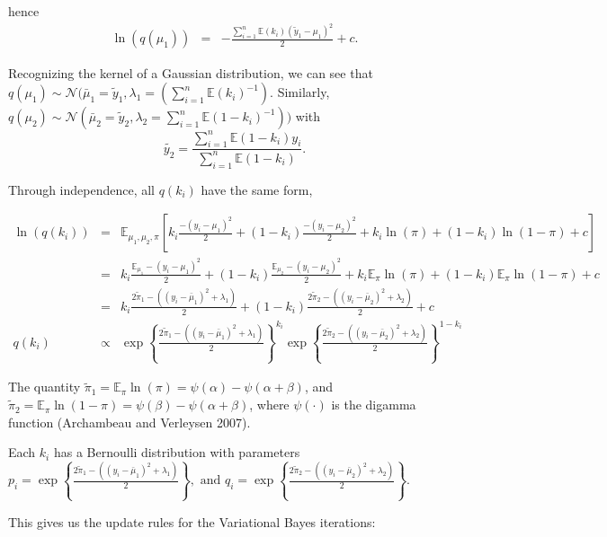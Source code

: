 \documentclass[12pt]{article}
\begin{document}
hence 
\begin{eqnarray*}
\ln(q(\mu_1)) & = & -\frac{\sum_{i=1}^{n}\mathbb{E}(k_i) (\tilde{y}_1-\mu_{1})^2}{2} + c.
\end{eqnarray*}


Recognizing the kernel of a Gaussian distribution, we can see that $q(\mu_1) \sim \mathcal{N} (\bar{\mu}_{1} = \tilde{y}_1, \lambda_{1} = (\sum_{i=1}^{n}\mathbb{E}(k_i)^{-1}).$
Similarly, $q(\mu_2) \sim \mathcal{N} (\bar{\mu}_{2} = \tilde{y}_2, \lambda_{2} = \sum_{i=1}^{n}\mathbb{E}(1-k_i)^{-1}))$ with
$$\tilde{y_2} = \frac{\sum_{i=1}^{n} \mathbb{E}(1-k_i)y_i}{\sum_{i=1}^{n} \mathbb{E}(1-k_i)}.$$

Through independence, all $q(k_i)$ have the same form,

\begin{eqnarray*}
\ln(q(k_i)) & = & \mathbb{E}_{\mu_1, \mu_2, \pi} \left[ k_{i} \frac{-(y_i-\mu_1)^2}{2} + (1-k_{i}) \frac{-(y_i-\mu_2)^2}{2} + k_i \ln(\pi) + (1-k_i) \ln(1-\pi) + c \right]\\
& = & k_i\frac{\mathbb{E}_{\mu_1} -(y_i-\mu_1)^2}{2}  + (1-k_i) \frac{\mathbb{E}_{\mu_2} -(y_i-\mu_2)^2}{2}  + k_i \mathbb{E}_\pi \ln(\pi) + (1-k_i) \mathbb{E}_\pi \ln(1-\pi) + c \\
& = & k_i \frac{2\tilde{\pi}_1-((y_i - \bar{\mu}_1)^2 + \lambda_1)}{2} + (1-k_i) \frac{2\tilde{\pi}_2-((y_i - \bar{\mu}_2)^2 + \lambda_2)}{2} + c\\
q(k_i) & \propto & \exp \left\{\frac{2\tilde{\pi}_1-((y_i - \bar{\mu}_1)^2 + \lambda_1)}{2} \right\}^{k_i} \exp \left\{\frac{2\tilde{\pi}_2-((y_i - \bar{\mu}_2)^2 + \lambda_2)}{2} \right\}^{1-k_i}
\end{eqnarray*}

The quantity $\tilde{\pi}_1 = \mathbb{E}_\pi \ln(\pi) = \psi(\alpha)-\psi(\alpha+\beta)$, and $\tilde{\pi}_2 = \mathbb{E}_\pi \ln(1-\pi) = \psi(\beta)-\psi(\alpha+\beta)$, where $\psi(\cdot)$ is the digamma function (Archambeau and Verleysen 2007).

Each $k_i$ has a Bernoulli distribution with parameters $p_i = \exp \left\{\frac{2\tilde{\pi}_1-((y_i - \bar{\mu}_1)^2 + \lambda_1)}{2} \right\}, \mbox{ and } q_i = \exp \left\{\frac{2\tilde{\pi}_2-((y_i - \bar{\mu}_2)^2 + \lambda_2)}{2} \right\}.$

This gives us the update rules for the Variational Bayes iterations:
\end{document}
